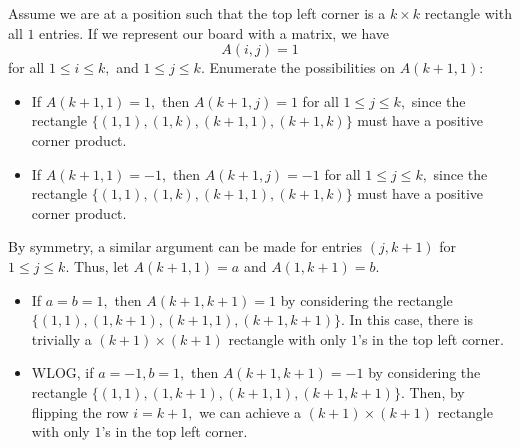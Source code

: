\documentclass[12pt]{article}
\begin{document}
\begin{enumerate}
\begin{enumerate}
        Assume we are at a position such that the top left corner is
        a $k \times k$ rectangle with all $1$ entries. If we
        represent our board with a matrix, we have
        $$
        A(i, j) = 1
        $$
        for all $1 \leq i \leq k,$ and $1 \leq j \leq k.$ Enumerate
        the possibilities on $A(k + 1, 1)$:
        \begin{itemize}
          \item If $A( k+1, 1) = 1,$ then $A(k + 1, j) = 1$ for all
            $1 \leq j \leq k,$ since the rectangle $\{(1, 1), (1, k),
            (k +1, 1), (k + 1, k)\}$ must have a positive corner product.
          \item If $A( k+1, 1) = -1,$ then $A(k + 1, j) = -1$ for all
            $1 \leq j \leq k,$ since the rectangle $\{(1, 1), (1, k),
            (k +1, 1), (k + 1, k)\}$ must have a positive corner product.
        \end{itemize}
        By symmetry, a similar argument can be made for entries $(j,
        k + 1)$ for $1 \leq j \leq k.$ Thus, let $A(k + 1, 1) = a$
        and $A(1, k + 1) = b$.
        \begin{itemize}
          \item If $a = b= 1,$ then $A(k + 1, k + 1) =1 $ by
            considering the rectangle $\{(1, 1), (1, k + 1), (k+ 1,
            1), (k + 1, k + 1)\}.$ In this case, there is trivially a
            $(k + 1) \times (k + 1)$ rectangle with only $1$'s in the
            top left corner.
          \item WLOG, if $a = -1, b = 1,$ then $A(k + 1, k + 1) = -1
            $ by considering the rectangle $\{(1, 1), (1, k + 1), (k+
            1, 1), (k + 1, k + 1)\}.$ Then, by flipping the row $i =
            k+1,$ we can achieve a $(k + 1) \times (k + 1)$ rectangle
            with only $1$'s in the top left corner.
        \end{itemize}


\end{enumerate}
\end{enumerate}
\end{document}
